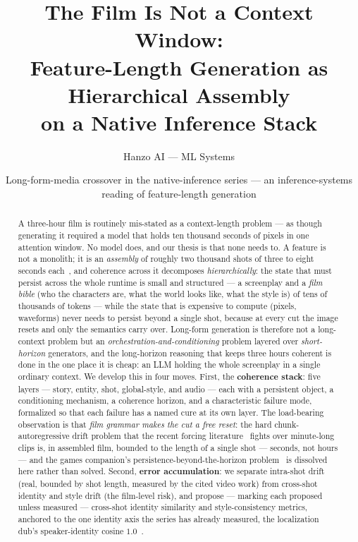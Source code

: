 \documentclass[11pt]{article}
\title{\textbf{The Film Is Not a Context Window:\\ Feature-Length Generation as Hierarchical Assembly\\ on a Native Inference Stack}}
\author{Hanzo AI --- ML Systems}
\date{Long-form-media crossover in the native-inference series --- an inference-systems reading of feature-length generation}
\begin{document}
\maketitle

\begin{abstract}
A three-hour film is routinely mis-stated as a context-length problem --- as though generating it required a
model that holds ten thousand seconds of pixels in one attention window. No model does, and our thesis is that
none needs to. A feature is not a monolith; it is an \emph{assembly} of roughly two thousand shots of three to
eight seconds each~\cite{cutting}, and coherence across it decomposes \emph{hierarchically}: the state that must
persist across the whole runtime is small and structured --- a screenplay and a \emph{film bible} (who the
characters are, what the world looks like, what the style is) of tens of thousands of tokens --- while the state
that is expensive to compute (pixels, waveforms) never needs to persist beyond a single shot, because at every
cut the image resets and only the semantics carry over. Long-form generation is therefore not a long-context
problem but an \emph{orchestration-and-conditioning} problem layered over \emph{short-horizon} generators, and
the long-horizon reasoning that keeps three hours coherent is done in the one place it is cheap: an LLM holding
the whole screenplay in a single ordinary context. We develop this in four moves. First, the \textbf{coherence
stack}: five layers --- story, entity, shot, global-style, and audio --- each with a persistent object, a
conditioning mechanism, a coherence horizon, and a characteristic failure mode, formalized so that each
failure has a named cure at its own layer. The load-bearing observation is that \emph{film grammar makes the
cut a free reset}: the hard chunk-autoregressive drift problem that the recent forcing
literature~\cite{diffusionforcing,selfforcing,causalforcing,oneforcing,tethercache,framepack} fights over
minute-long clips is, in assembled film, bounded to the length of a single shot --- seconds, not hours --- and
the games companion's persistence-beyond-the-horizon problem~\cite{games} is dissolved here rather than solved.
Second, \textbf{error accumulation}: we separate intra-shot drift (real, bounded by shot length, measured by the
cited video work) from cross-shot identity and style drift (the film-level risk), and propose --- marking each
proposed unless measured --- cross-shot identity similarity and style-consistency metrics, anchored to the one
identity axis the series has already measured, the localization dub's speaker-identity cosine $1.0$~\cite{games}.

\end{abstract}
\end{document}

